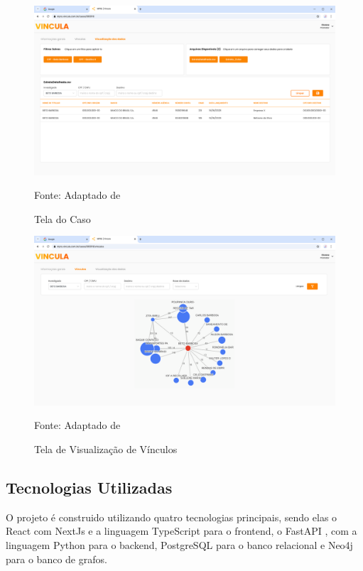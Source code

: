   \begin{figure}[H]
    \centering
    \small
    \includegraphics[width=1\linewidth]{conteudo//2 - ages I//conteudo//figures//tela-caso.png}
    \caption{Tela do Caso}
    Fonte: Adaptado de \textcites{figma-vincula}
    \label{fig:tela-caso}
  \end{figure}

  \begin{figure}[H]
    \centering
    \small
    \includegraphics[width=1\linewidth]{conteudo//2 - ages I//conteudo//figures//tela-vinculos.png}
    \caption{Tela de Visualização de Vínculos}
    Fonte: Adaptado de \textcites{figma-vincula}
    \label{fig:tela-vinculos}
  \end{figure}

\subsection{Tecnologias Utilizadas}
  O projeto é construido utilizando quatro tecnologias principais, sendo elas o React \cite{react} com NextJs \cite{nextjs} e a linguagem TypeScript \cite{typescript} para o frontend, o FastAPI \cite{fastapi}, com a linguagem Python para o backend, PostgreSQL para o banco relacional e Neo4j \cite{neo4j} para o banco de grafos.
  
